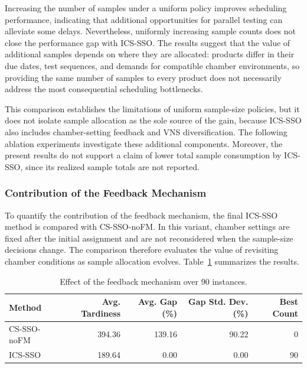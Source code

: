 \documentclass[11pt]{article}
\begin{document}
Increasing the number of samples under a uniform policy improves scheduling performance, indicating that additional opportunities for parallel testing can alleviate some delays. Nevertheless, uniformly increasing sample counts does not close the performance gap with ICS-SSO. The results suggest that the value of additional samples depends on where they are allocated: products differ in their due dates, test sequences, and demands for compatible chamber environments, so providing the same number of samples to every product does not necessarily address the most consequential scheduling bottlenecks.

This comparison establishes the limitations of uniform sample-size policies, but it does not isolate sample allocation as the sole source of the gain, because ICS-SSO also includes chamber-setting feedback and VNS diversification. The following ablation experiments investigate these additional components. Moreover, the present results do not support a claim of lower total sample consumption by ICS-SSO, since its realized sample totals are not reported.

\subsubsection{Contribution of the Feedback Mechanism}
\label{subsubsec:feedback}

To quantify the contribution of the feedback mechanism, the final ICS-SSO method is compared with CS-SSO-noFM. In this variant, chamber settings are fixed after the initial assignment and are not reconsidered when the sample-size decisions change. The comparison therefore evaluates the value of revisiting chamber conditions as sample allocation evolves. Table~\ref{tab:feedback_comparison} summarizes the results.

\begin{table}[H]
\centering
\caption{Effect of the feedback mechanism over 90 instances.}
\label{tab:feedback_comparison}
\footnotesize
\setlength{\tabcolsep}{4pt}
\begin{tabular}{lrrrr}
\hline
\textbf{Method} & \textbf{Avg. Tardiness} & \textbf{Avg. Gap (\%)} & \textbf{Gap Std. Dev. (\%)} & \textbf{Best Count} \\
\hline
CS-SSO-noFM & 394.36 & 139.16 & 90.22 & 0 \\
ICS-SSO & 189.64 & 0.00 & 0.00 & 90 \\
\hline
\end{tabular}
\end{table}
\end{document}
